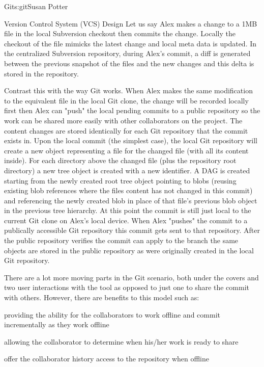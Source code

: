 \begin{aosachapter}{Git}{s:git}{Susan Potter}
\begin{aosasect1}{Version Control System (VCS) Design}
Let us say Alex makes a change to a 1MB file in the local Subversion
checkout then commits the change. Locally the checkout of the file mimicks
the latest change and local meta data is updated. In the centralized
Subversion repository, during Alex's commit, a diff is generated between the
previous snapshot of the files and the new changes and this delta is stored
in the repository.

Contrast this with the way Git works.
When Alex makes the same modification to the equivalent file in the local
Git clone, the change will be recorded locally first then Alex can "push"
the local pending commits to a public repository so the work can be shared
more easily with other collaborators on the project. The content changes are
stored identically for each Git repository that the commit exists in. Upon
the local commit (the simplest case), the local Git repository will create a
new object representing a file for the changed file (with all its content
inside). For each directory above the changed file (plus the repository
root directory) a new tree object is created with a new identifier. A DAG
is created starting from the newly created root tree object pointing to
blobs (reusing existing blob references where the files content has not
changed in this commit) and referencing the newly created blob in place
of that file's previous blob object in the previous tree hierarchy. At this
point the commit is still just local to the current Git clone on Alex's
local device. When Alex "pushes" the commit to a publically accessible
Git repository this commit gets sent to that repository. After the public
repository verifies the commit can apply to the branch the same objects
are stored in the public repository as were originally created in the
local Git repository.

There are a lot more moving parts in the Git scenario, both under the
covers and two user interactions with the tool as opposed to just one
to share the commit with others. However, there are benefits to this
model such as:
\begin{aosaitemize}
  \item providing the ability for the collaborators to work offline and
    commit incrementally as they work offline
  \item allowing the collaborator to determine when his/her work is
    ready to share
  \item offer the collaborator history access to the repository when
    offline
\end{aosaitemize}


\end{aosasect1}
\end{aosachapter}
